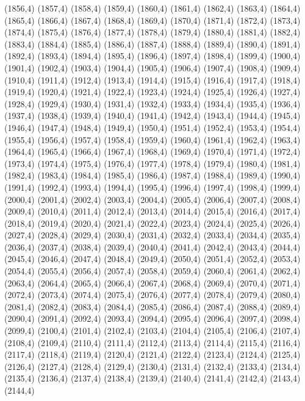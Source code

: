 (1856,4)
(1857,4)
(1858,4)
(1859,4)
(1860,4)
(1861,4)
(1862,4)
(1863,4)
(1864,4)
(1865,4)
(1866,4)
(1867,4)
(1868,4)
(1869,4)
(1870,4)
(1871,4)
(1872,4)
(1873,4)
(1874,4)
(1875,4)
(1876,4)
(1877,4)
(1878,4)
(1879,4)
(1880,4)
(1881,4)
(1882,4)
(1883,4)
(1884,4)
(1885,4)
(1886,4)
(1887,4)
(1888,4)
(1889,4)
(1890,4)
(1891,4)
(1892,4)
(1893,4)
(1894,4)
(1895,4)
(1896,4)
(1897,4)
(1898,4)
(1899,4)
(1900,4)
(1901,4)
(1902,4)
(1903,4)
(1904,4)
(1905,4)
(1906,4)
(1907,4)
(1908,4)
(1909,4)
(1910,4)
(1911,4)
(1912,4)
(1913,4)
(1914,4)
(1915,4)
(1916,4)
(1917,4)
(1918,4)
(1919,4)
(1920,4)
(1921,4)
(1922,4)
(1923,4)
(1924,4)
(1925,4)
(1926,4)
(1927,4)
(1928,4)
(1929,4)
(1930,4)
(1931,4)
(1932,4)
(1933,4)
(1934,4)
(1935,4)
(1936,4)
(1937,4)
(1938,4)
(1939,4)
(1940,4)
(1941,4)
(1942,4)
(1943,4)
(1944,4)
(1945,4)
(1946,4)
(1947,4)
(1948,4)
(1949,4)
(1950,4)
(1951,4)
(1952,4)
(1953,4)
(1954,4)
(1955,4)
(1956,4)
(1957,4)
(1958,4)
(1959,4)
(1960,4)
(1961,4)
(1962,4)
(1963,4)
(1964,4)
(1965,4)
(1966,4)
(1967,4)
(1968,4)
(1969,4)
(1970,4)
(1971,4)
(1972,4)
(1973,4)
(1974,4)
(1975,4)
(1976,4)
(1977,4)
(1978,4)
(1979,4)
(1980,4)
(1981,4)
(1982,4)
(1983,4)
(1984,4)
(1985,4)
(1986,4)
(1987,4)
(1988,4)
(1989,4)
(1990,4)
(1991,4)
(1992,4)
(1993,4)
(1994,4)
(1995,4)
(1996,4)
(1997,4)
(1998,4)
(1999,4)
(2000,4)
(2001,4)
(2002,4)
(2003,4)
(2004,4)
(2005,4)
(2006,4)
(2007,4)
(2008,4)
(2009,4)
(2010,4)
(2011,4)
(2012,4)
(2013,4)
(2014,4)
(2015,4)
(2016,4)
(2017,4)
(2018,4)
(2019,4)
(2020,4)
(2021,4)
(2022,4)
(2023,4)
(2024,4)
(2025,4)
(2026,4)
(2027,4)
(2028,4)
(2029,4)
(2030,4)
(2031,4)
(2032,4)
(2033,4)
(2034,4)
(2035,4)
(2036,4)
(2037,4)
(2038,4)
(2039,4)
(2040,4)
(2041,4)
(2042,4)
(2043,4)
(2044,4)
(2045,4)
(2046,4)
(2047,4)
(2048,4)
(2049,4)
(2050,4)
(2051,4)
(2052,4)
(2053,4)
(2054,4)
(2055,4)
(2056,4)
(2057,4)
(2058,4)
(2059,4)
(2060,4)
(2061,4)
(2062,4)
(2063,4)
(2064,4)
(2065,4)
(2066,4)
(2067,4)
(2068,4)
(2069,4)
(2070,4)
(2071,4)
(2072,4)
(2073,4)
(2074,4)
(2075,4)
(2076,4)
(2077,4)
(2078,4)
(2079,4)
(2080,4)
(2081,4)
(2082,4)
(2083,4)
(2084,4)
(2085,4)
(2086,4)
(2087,4)
(2088,4)
(2089,4)
(2090,4)
(2091,4)
(2092,4)
(2093,4)
(2094,4)
(2095,4)
(2096,4)
(2097,4)
(2098,4)
(2099,4)
(2100,4)
(2101,4)
(2102,4)
(2103,4)
(2104,4)
(2105,4)
(2106,4)
(2107,4)
(2108,4)
(2109,4)
(2110,4)
(2111,4)
(2112,4)
(2113,4)
(2114,4)
(2115,4)
(2116,4)
(2117,4)
(2118,4)
(2119,4)
(2120,4)
(2121,4)
(2122,4)
(2123,4)
(2124,4)
(2125,4)
(2126,4)
(2127,4)
(2128,4)
(2129,4)
(2130,4)
(2131,4)
(2132,4)
(2133,4)
(2134,4)
(2135,4)
(2136,4)
(2137,4)
(2138,4)
(2139,4)
(2140,4)
(2141,4)
(2142,4)
(2143,4)
(2144,4)
